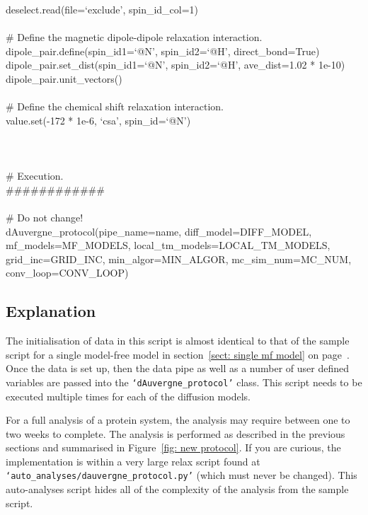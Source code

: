 \begin{htmlonly}
\begin{htmlonly}
\begin{exampleenv}
deselect.read(file=`exclude', spin\_id\_col=1) \\
 \\
\# Define the magnetic dipole-dipole relaxation interaction. \\
dipole\_pair.define(spin\_id1=`@N', spin\_id2=`@H', direct\_bond=True) \\
dipole\_pair.set\_dist(spin\_id1=`@N', spin\_id2=`@H', ave\_dist=1.02 * 1e-10) \\
dipole\_pair.unit\_vectors() \\
 \\
\# Define the chemical shift relaxation interaction. \\
value.set(-172 * 1e-6, `csa', spin\_id=`@N') \\
 \\
 \\
 \\
\# Execution. \\
\#\#\#\#\#\#\#\#\#\#\#\# \\
 \\
\# Do not change! \\
dAuvergne\_protocol(pipe\_name=name, diff\_model=DIFF\_MODEL, mf\_models=MF\_MODELS, local\_tm\_models=LOCAL\_TM\_MODELS, grid\_inc=GRID\_INC, min\_algor=MIN\_ALGOR, mc\_sim\_num=MC\_NUM, conv\_loop=CONV\_LOOP) \\
\end{exampleenv}



\subsection{Explanation}

The initialisation of data in this script is almost identical to that of the sample script for a single model-free model in section~\ref{sect: single mf model} on page~\pageref{sect: single mf model}.  Once the data is set up, then the data pipe as well as a number of user defined variables are passed into the \texttt{`dAuvergne\_protocol'} class.  This script needs to be executed multiple times for each of the diffusion models.

For a full analysis of a protein system, the analysis may require between one to two weeks to complete.  The analysis is performed as described in the previous sections and summarised in Figure~\ref{fig: new protocol}.  If you are curious, the implementation is within a very large relax script found at \texttt{`auto\_analyses/dauvergne\_protocol.py'} (which must never be changed).  This auto-analyses script hides all of the complexity of the analysis from the sample script.




\end{htmlonly}
\end{htmlonly}
